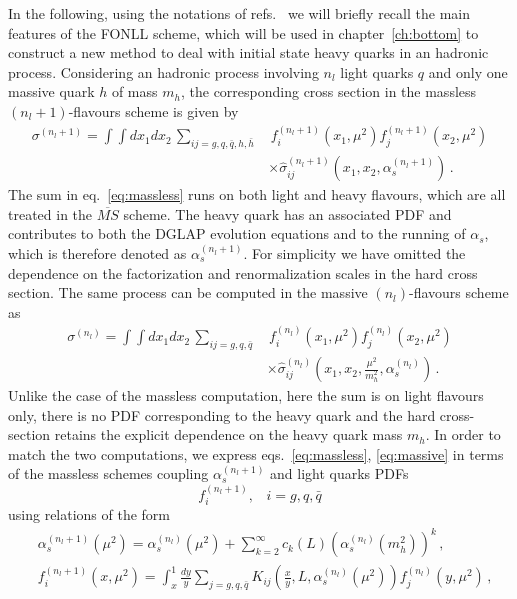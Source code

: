 %
In the following, using the notations of refs.~\cite{Forte:2010ta,Forte:2015hba} we will briefly recall 
the main features of the FONLL scheme, which will be used in
chapter~\ref{ch:bottom} to construct a new method to deal with initial state heavy quarks in an hadronic process.
Considering an hadronic process involving $n_l$ light quarks $q$  and only one massive quark $h$ of mass $m_h$,
the corresponding cross section in the massless $(n_l+1)$-flavours scheme is given by
\begin{align}
    \label{eq:massless}
    \sigma^{(n_l+1)} = \int \int dx_1 dx_2\, \sum_{ij=g,q,\bar{q},h,\bar{h}}&\, 
    f_i^{(n_l+1)}\left(x_1,\mu^2\right)f_j^{(n_l+1)}\left(x_2,\mu^2\right) \nonumber \\
    &\times\hat{\sigma}^{(n_l+1)}_{ij}\left(x_1,x_2,\alpha_s^{(n_l+1)}\right)\,.
\end{align}
The sum in eq.~\eqref{eq:massless} runs on both light and heavy flavours, which are all treated in the
$\overline{MS}$ scheme. The heavy quark has an associated PDF and contributes to both the
DGLAP evolution equations and to the running of $\alpha_s$, which is therefore denoted as $\alpha_s^{(n_l+1)}$. 
For simplicity we have omitted the
dependence on the factorization and renormalization scales in the hard cross section.
The same process can be computed in the massive $(n_l)$-flavours scheme as
\begin{align}
    \label{eq:massive}
    \sigma^{(n_l)} = \int \int dx_1 dx_2\, \sum_{ij=g,q,\bar{q}}&\, 
    f_i^{(n_l)}\left(x_1,\mu^2\right)f_j^{(n_l)}\left(x_2,\mu^2\right) \nonumber \\
    &\times\hat{\sigma}^{(n_l)}_{ij}\left(x_1,x_2,\frac{\mu^2}{m_h^2},\alpha_s^{(n_l)}\right)\,.
\end{align}
Unlike the case of the massless computation, here the sum is on light flavours only, there is no PDF corresponding
to the heavy quark and the hard cross-section retains the explicit dependence on the heavy quark mass $m_h$.
In order to match the two computations, we express eqs.~\eqref{eq:massless}, \eqref{eq:massive} in terms of 
the massless schemes coupling $\alpha_s^{(n_l+1)}$ and light quarks PDFs 
\[ f^{(n_l+1)}_i,\,\,\,\,\, i = g,q,\bar{q} \] 
using relations of the form
\begin{align}
    \label{eq:matching_alpha}
    &\alpha_s^{(n_l+1)}\left(\mu^2\right) = 
    \alpha_s^{(n_l)}\left(\mu^2\right) 
    + \sum_{k=2}^{\infty} c_k\left(L\right) \left(\alpha_s^{(n_l)}\left(m_h^2\right)\right)^k\,, \\
    \label{eq:matching_PDFs}
    &f_i^{(n_l+1)}\left(x,\mu^2\right) = \int_x^1 \frac{dy}{y} 
    \sum_{j=g,q,\bar{q}} K_{ij}\left(\frac{x}{y}, L, \alpha_s^{(n_l)}\left(\mu^2\right)\right) f_j^{(n_l)}\left(y,\mu^2\right)\,,
\end{align}
